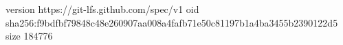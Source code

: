 version https://git-lfs.github.com/spec/v1
oid sha256:f9bdfbf79848c48e260907aa008a4fafb71e50c81197b1a4ba3455b2390122d5
size 184776
